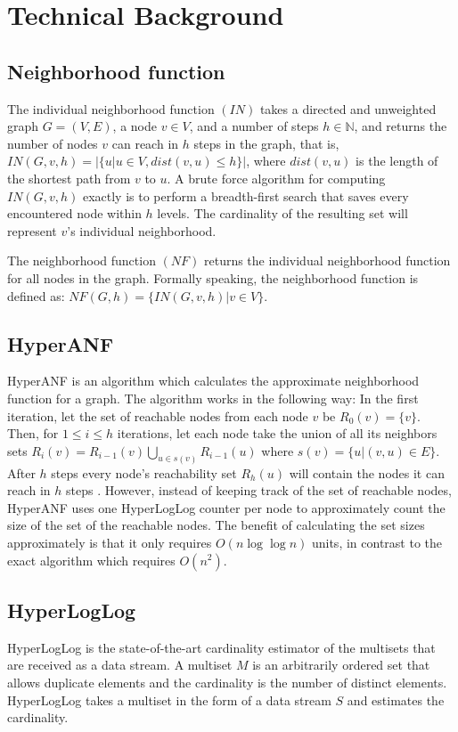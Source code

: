 \chapter{Technical Background}

\section{Neighborhood function}
The individual neighborhood function $(IN)$ takes a directed and unweighted graph $G = (V,E)$, a node $v \in V$, and a number of steps $h \in \mathbb{N}$, and returns the number of nodes $v$ can reach in $h$ steps in the graph, that is, $IN(G,v,h) = |\{u | u \in V, dist(v,u) \leq h\}|$, where $dist(v,u)$ is the length of the shortest path from $v$ to $u$. A brute force algorithm for computing $IN(G,v,h)$ exactly is to perform a breadth-first search that saves every encountered node within $h$ levels. The cardinality of the resulting set will represent $v$'s individual neighborhood.

The neighborhood function $(NF)$ returns the individual neighborhood function for all nodes in the graph. Formally speaking, the neighborhood function is defined as: $NF(G,h) = \{ IN(G,v,h) | v \in V \}$.

\section{HyperANF}
HyperANF is an algorithm which calculates the approximate neighborhood function for a graph. The algorithm works in the following way: In the first iteration, let the set of reachable nodes from each node $v$ be $R_0(v) = \{v\}$. Then, for $1 \leq i \leq h$ iterations, let each node take the union of all its neighbors sets $R_i(v) = R_{i-1}(v) \bigcup\limits_{u \in s(v)} R_{i-1}(u) $ where $s(v) = \{u | (v,u) \in E\}$. After $h$ steps every node's reachability set $R_h(u)$ will contain the nodes it can reach in $h$ steps \cite{hyperball}. However, instead of keeping track of the set of reachable nodes, HyperANF uses one HyperLogLog counter per node to approximately count the size of the set of the reachable nodes. The benefit of calculating the set sizes approximately is that it only requires $O(n\log\log n)$ units, in contrast to the exact algorithm which requires $O(n^2)$.

\section{HyperLogLog}
HyperLogLog \cite{hyperloglog} is the state-of-the-art cardinality estimator of the multisets that are received as a data stream. A multiset $M$ is an arbitrarily ordered set that allows duplicate elements and the cardinality is the number of distinct elements. HyperLogLog takes a multiset in the form of a data stream $S$ and estimates the cardinality.

